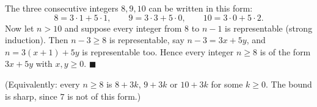 The three consecutive integers $8,9,10$ can be written in this form:
\[
8=3\cdot1+5\cdot1,\qquad 9=3\cdot3+5\cdot0,\qquad 10=3\cdot0+5\cdot2 .
\]
Now let $n>10$ and suppose every integer from $8$ to $n-1$ is representable (strong induction). Then $n-3\ge8$ is representable, say $n-3=3x+5y$, and $n=3(x+1)+5y$ is representable too. Hence every integer $n\ge8$ is of the form $3x+5y$ with $x,y\ge0$. $\blacksquare$

(Equivalently: every $n\ge8$ is $8+3k$, $9+3k$ or $10+3k$ for some $k\ge0$. The bound is sharp, since $7$ is not of this form.)
